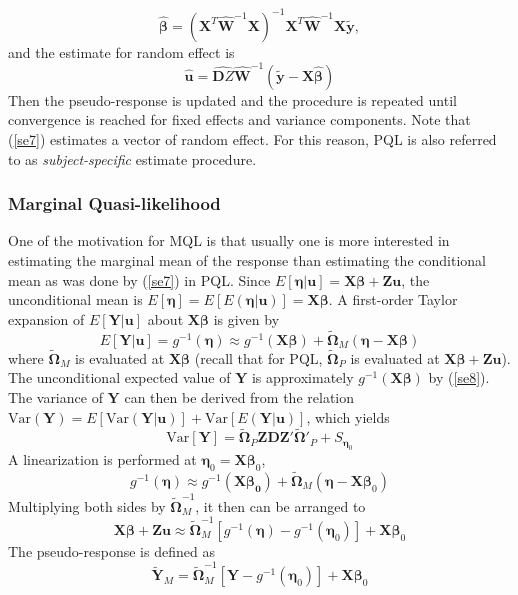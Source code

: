 	\begin{equation}
		\hat{\bm\beta} = (\bm X^T\hat{\bm W}^{-1} \bm X)^{-1}\bm X^T\hat{\bm W}^{-1}\bm X \tilde{\bm y},
	\end{equation}
	and the estimate for random effect is 
	\begin{equation}\label{se7}
		\hat{\bm u} = \hat{\bm DZ} \hat{\bm W}^{-1} (\tilde{\bm y}-\bm {X} \hat{\bm \beta})
	\end{equation}
	Then the pseudo-response is updated and the procedure is repeated until convergence is reached for fixed effects and variance components.  Note that (\ref{se7}) estimates a vector of random effect. For this reason, PQL is also referred to as \textit{subject-specific} estimate procedure. 
	
	\subsubsection{Marginal Quasi-likelihood} 
	One of the motivation for MQL is that usually one is more interested in estimating the marginal mean of the response than estimating the conditional mean as was done by (\ref{se7}) in PQL. Since $E[\bm \eta|\bm u]= \bm {X\beta} + \bm {Zu}$, the unconditional mean is $E[\bm \eta] = E[E(\bm \eta|\bm u)]= \bm {X\beta}$. A first-order Taylor expansion of $E[\bm Y|\bm u]$ about $\bm X \bm\beta$ is given by 
	\begin{equation}\label{se8}
		E[\bm Y|\bm u] = g^{-1}(\bm \eta) \approx g^{-1} (\bm{X\beta}) + \tilde{\bm \Omega}_{M} (\bm \eta - \bm X\bm \beta)
	\end{equation}
	where $\tilde{\bm \Omega}_{M}$ is evaluated at $\bm {X\beta}$ (recall that for PQL, $\tilde{\bm \Omega}_P$ is evaluated at $\bm {X\beta} + \bm {Zu}$). The unconditional expected value of  $\bm Y$ is approximately $g^{-1}(\bm {X\beta})$ by (\ref{se8}). The variance of $\bm Y$ can then be derived from the relation $\text{Var}(\bm Y)= E[\text{Var}(\bm Y|\bm u)] + \text{Var}[E(\bm Y| \bm u)]$, which yields
	\begin{equation}\label{se9}
		\text{Var}[\bm Y] = \tilde{\bm \Omega}_P \bm {ZDZ'}\tilde{\bm \Omega}'_P + S_{\bm \eta_0}
	\end{equation}
	A linearization is performed at $\bm \eta_0= \bm X \bm \beta_0$, 
	\[ g^{-1}(\bm \eta) \approx g^{-1} (\bm{X\beta_0}) + \tilde{\bm \Omega}_{M} (\bm \eta - \bm X\bm \beta_0)\]
	Multiplying both sides by $\tilde{\bm \Omega}_{M} ^{-1}$, it then can be arranged to 
	\[\bm {X\beta} + \bm {Zu} \approx \tilde{\bm \Omega}_M^{-1}[g^{-1}(\bm\eta)- g^{-1}(\bm \eta_0)]  + \bm{X}\bm \beta_0 \]
	The pseudo-response is defined as 
	\begin{equation}\label{se10}
		\tilde{\bm Y}_M =  \tilde{\bm \Omega}_M^{-1}[\bm Y- g^{-1}(\bm \eta_0)]  + \bm{X}\bm \beta_0 
	\end{equation}
	
